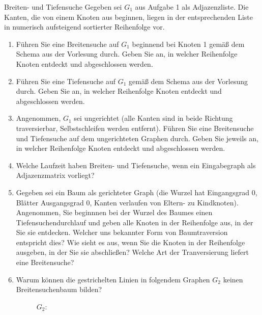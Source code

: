 \documentclass[11pt,a4paper]{article}
\begin{document}
\begin{aufgabe}{2}{Breiten- und Tiefensuche}
    Gegeben sei $G_1$ aus Aufgabe 1 als Adjazenzliste.
    Die Kanten, die von einem Knoten aus beginnen, liegen in der entsprechenden Liste in numerisch aufsteigend sortierter Reihenfolge vor.
    \begin{enumerate}
        \item Führen Sie eine Breitensuche auf $G_1$ beginnend bei Knoten 1 gemäß dem Schema aus der Vorlesung durch.
        Geben Sie an, in welcher Reihenfolge Knoten ent\-deckt und abgeschlossen werden.
        \item Führen Sie eine Tiefensuche auf $G_1$ gemäß dem Schema aus der Vorlesung durch.
        Geben Sie an, in welcher Reihenfolge Knoten entdeckt und abgeschlossen werden.
        \item Angenommen, $G_1$ sei ungerichtet (alle Kanten sind in beide Richtung traversierbar, Selbstschleifen werden entfernt).
        Führen Sie eine Breitensuche und Tiefensuche auf dem ungerichteten Graphen durch.
        Geben Sie jeweils an, in welcher Reihenfolge Knoten entdeckt und abgeschlossen werden.
        \item Welche Laufzeit haben Breiten- und Tiefensuche, wenn ein Eingabegraph als Adjazenzmatrix vorliegt?
        \item
        Gegeben sei ein Baum als gerichteter Graph (die Wurzel hat Eingangsgrad 0, Blätter Ausgangsgrad 0, Kanten verlaufen von Eltern- zu Kindknoten).
        Angenommen, Sie beginnnen bei der Wurzel des Baumes einen Tiefensuchendurchlauf und geben alle Knoten in der Reihenfolge aus, in der Sie sie entdecken.
        Welcher uns bekannter Form von Baumtraversion entspricht dies?
        Wie sieht es aus, wenn Sie die Knoten in der Reihenfolge ausgeben, in der Sie sie abschließen?
        Welche Art der Tranversierung liefert eine Breitensuche?
        \item
        Warum können die gestrichelten Linien in folgendem Graphen $G_2$ keinen Breitensuchenbaum bilden?
        \begin{figure}[h!]
            \centering
        $G_2$:
        \begin{subfigure}[c]{0.2\textwidth}
            \centering
\end{subfigure}
\end{figure}
\end{enumerate}
\end{aufgabe}
\end{document}
